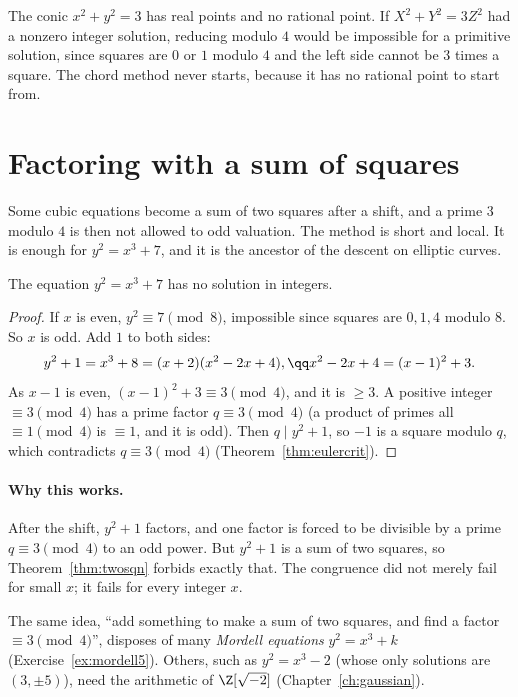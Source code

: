 \begin{examplex}
The conic $x^2+y^2=3$ has real points and no rational point. If $X^2+Y^2=3Z^2$ had a nonzero integer solution, reducing modulo $4$ would be impossible for a primitive solution, since squares are $0$ or $1$ modulo $4$ and the left side cannot be $3$ times a square. The chord method never starts, because it has no rational point to start from.
\end{examplex}

\section{Factoring with a sum of squares}

Some cubic equations become a sum of two squares after a shift, and a prime $3$ modulo $4$ is then not allowed to odd valuation. The method is short and local. It is enough for $y^2=x^3+7$, and it is the ancestor of the descent on elliptic curves.

\begin{theorem}\label{thm:mordell7}
The equation $y^2=x^3+7$ has no solution in integers.
\end{theorem}
\begin{proof}
If $x$ is even, $y^2\equiv7\pmod8$, impossible since squares are $0,1,4$ modulo $8$. So $x$ is odd. Add $1$ to both sides:
\[
\begin{gathered}y^2+1=x^3+8=(x+2)(x^2-2x+4),\qq x^2-2x+4=(x-1)^2+3.\end{gathered}
\]
As $x-1$ is even, $(x-1)^2+3\equiv3\pmod4$, and it is $\ge3$. A positive integer $\equiv3\pmod4$ has a prime factor $q\equiv3\pmod4$ (a product of primes all $\equiv1\pmod4$ is $\equiv1$, and it is odd). Then $q\mid y^2+1$, so $-1$ is a square modulo $q$, which contradicts $q\equiv3\pmod4$ (Theorem~\ref{thm:eulercrit}).
\end{proof}

\paragraph{Why this works.}
After the shift, $y^2+1$ factors, and one factor is forced to be divisible by a prime $q\equiv 3\pmod 4$ to an odd power. But $y^2+1$ is a sum of two squares, so Theorem~\ref{thm:twosqn} forbids exactly that. The congruence did not merely fail for small $x$; it fails for every integer $x$.

The same idea, ``add something to make a sum of two squares, and find a factor $\equiv3\pmod4$'', disposes of many \emph{Mordell equations} $y^2=x^3+k$ (Exercise~\ref{ex:mordell5}). Others, such as $y^2=x^3-2$ (whose only solutions are $(3,\pm5)$), need the arithmetic of $\Z[\sqrt{-2}]$ (Chapter~\ref{ch:gaussian}).

